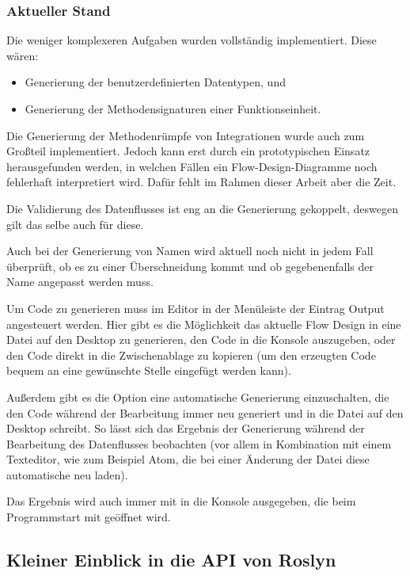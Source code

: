 \subsubsection{Aktueller Stand}

Die weniger komplexeren Aufgaben wurden vollständig implementiert.
Diese wären: 
\begin{itemize}
	\item Generierung der benutzerdefinierten Datentypen, und 
	\item Generierung der Methodensignaturen einer Funktionseinheit.
\end{itemize}

Die Generierung der Methodenrümpfe von Integrationen wurde auch zum Großteil implementiert.
Jedoch kann erst durch ein prototypischen Einsatz herausgefunden werden, in welchen Fällen ein Flow-Design-Diagramme noch fehlerhaft interpretiert wird. Dafür fehlt im Rahmen dieser Arbeit aber die Zeit.

Die Validierung des Datenflusses ist eng an die Generierung gekoppelt, deswegen gilt das selbe auch für diese. 

Auch bei der Generierung von Namen wird aktuell noch nicht in jedem Fall überprüft, ob es zu einer Überschneidung kommt und ob gegebenenfalls der Name angepasst werden muss.

\bigskip

Um Code zu generieren muss im Editor in der Menüleiste der Eintrag Output angesteuert werden.
Hier gibt es die Möglichkeit das aktuelle Flow Design in eine Datei auf den Desktop zu
generieren, den Code in die Konsole auszugeben, oder den Code direkt in die Zwischenablage zu kopieren (um den erzeugten Code bequem an eine gewünschte Stelle eingefügt werden kann).

Außerdem gibt es die Option eine automatische Generierung einzuschalten, die
den Code während der Bearbeitung immer neu generiert und in die Datei
auf den Desktop schreibt. So lässt sich das Ergebnis der Generierung während der Bearbeitung
des Datenflusses beobachten (vor allem in Kombination mit einem
Texteditor, wie zum Beispiel Atom, die bei einer Änderung der Datei diese automatische neu laden).

Das Ergebnis wird auch immer mit in die Konsole ausgegeben, die beim
Programmstart mit geöffnet wird.


\subsection{Kleiner Einblick in die API von Roslyn}

